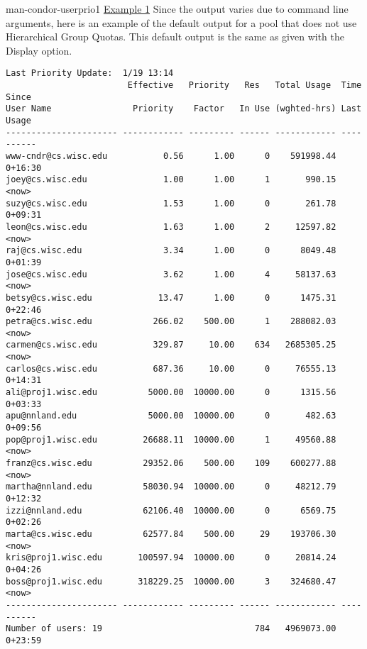 \begin{ManPage}{}{man-condor-userprio}{1}
\underline{Example 1} Since the output varies due to command line arguments, 
here is an example of the default output for a pool that does not use 
Hierarchical Group Quotas.
This default output is the same as given with the  Display option.
\scriptsize
\begin{verbatim}
Last Priority Update:  1/19 13:14
                        Effective   Priority   Res   Total Usage  Time Since
User Name                Priority    Factor   In Use (wghted-hrs) Last Usage
---------------------- ------------ --------- ------ ------------ ----------
www-cndr@cs.wisc.edu           0.56      1.00      0    591998.44    0+16:30
joey@cs.wisc.edu               1.00      1.00      1       990.15 <now>
suzy@cs.wisc.edu               1.53      1.00      0       261.78    0+09:31
leon@cs.wisc.edu               1.63      1.00      2     12597.82 <now>
raj@cs.wisc.edu                3.34      1.00      0      8049.48    0+01:39
jose@cs.wisc.edu               3.62      1.00      4     58137.63 <now>
betsy@cs.wisc.edu             13.47      1.00      0      1475.31    0+22:46
petra@cs.wisc.edu            266.02    500.00      1    288082.03 <now>
carmen@cs.wisc.edu           329.87     10.00    634   2685305.25 <now>
carlos@cs.wisc.edu           687.36     10.00      0     76555.13    0+14:31
ali@proj1.wisc.edu          5000.00  10000.00      0      1315.56    0+03:33
apu@nnland.edu              5000.00  10000.00      0       482.63    0+09:56
pop@proj1.wisc.edu         26688.11  10000.00      1     49560.88 <now>
franz@cs.wisc.edu          29352.06    500.00    109    600277.88 <now>
martha@nnland.edu          58030.94  10000.00      0     48212.79    0+12:32
izzi@nnland.edu            62106.40  10000.00      0      6569.75    0+02:26
marta@cs.wisc.edu          62577.84    500.00     29    193706.30 <now>
kris@proj1.wisc.edu       100597.94  10000.00      0     20814.24    0+04:26
boss@proj1.wisc.edu       318229.25  10000.00      3    324680.47 <now>
---------------------- ------------ --------- ------ ------------ ----------
Number of users: 19                              784   4969073.00    0+23:59 
\end{verbatim}
\normalsize


\end{ManPage}

